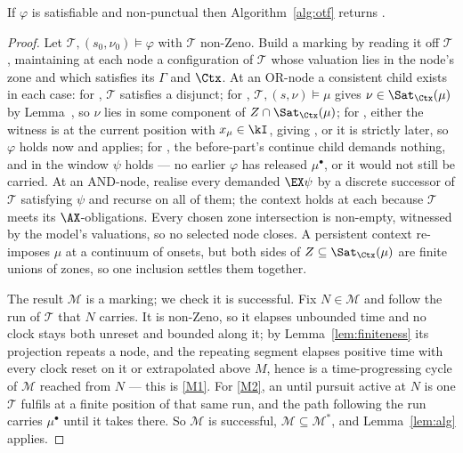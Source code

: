 \begin{theorem}[Completeness]\label{thm:completeness}
If $\varphi$ is satisfiable and non-punctual then Algorithm~\ref{alg:otf} returns \SAT.
\end{theorem}
\begin{proof}
Let $\mathcal T,(s_0,\nu_0)\models\varphi$ with $\mathcal T$ non-Zeno. Build a marking by reading it
off $\mathcal T$, maintaining at each node a configuration of $\mathcal T$ whose valuation lies in the
node's zone and which satisfies its $\Gamma$ and $\Ctx$. At an OR-node a consistent child exists in
each case: for , $\mathcal T$ satisfies a disjunct; for ,
$\mathcal T,(s,\nu)\models\mu$ gives $\nu\in\Sat_{\Ctx}(\mu)$ by Lemma~, so $\nu$
lies in some component of $Z\cap\Sat_{\Ctx}(\mu)$; for , either the witness is at the
current position with $x_\mu\in\kI$, giving , or it is strictly later, so $\varphi$
holds now and  applies; for , the before-part's continue child demands
nothing, and in the window $\psi$ holds --- no earlier $\varphi$ has released $\mu^\bullet$, or it
would not still be carried. At an AND-node, realise every demanded $\EX\psi$ by a discrete successor
of $\mathcal T$ satisfying $\psi$ and recurse on all of them; the context holds at each because
$\mathcal T$ meets its $\AX$-obligations. Every chosen zone intersection is non-empty, witnessed by
the model's valuations, so no selected node closes. A persistent context re-imposes $\mu$ at a
continuum of onsets, but both sides of $Z\subseteq\Sat_{\Ctx}(\mu)$ are finite unions of zones, so one
inclusion settles them together.

The result $\mathcal M$ is a marking; we check it is successful. Fix $N\in\mathcal M$ and follow the
run of $\mathcal T$ that $N$ carries. It is non-Zeno, so it elapses unbounded time and no clock stays
both unreset and bounded along it; by Lemma~\ref{lem:finiteness} its projection repeats a node, and
the repeating segment elapses positive time with every clock reset on it or extrapolated above $M$,
hence is a time-progressing cycle of $\mathcal M$ reached from $N$ --- this is \ref{M1}. For \ref{M2},
an until pursuit active at $N$ is one $\mathcal T$ fulfils at a finite position of that same run, and
the path following the run carries $\mu^\bullet$ until it takes  there. So
$\mathcal M$ is successful, $\mathcal M\subseteq\mathcal M^{*}$, and Lemma~\ref{lem:alg} applies.
\end{proof}

